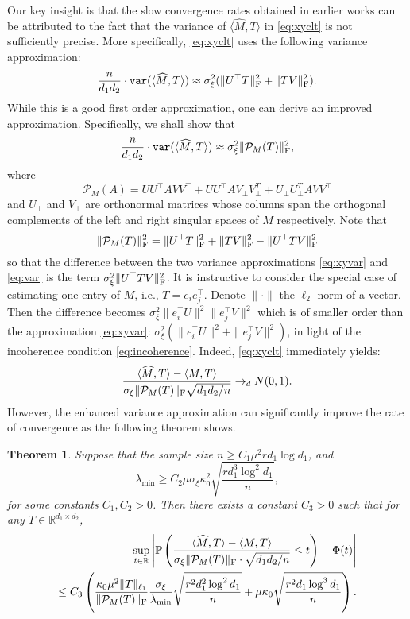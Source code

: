 \documentclass[12pt]{article}
\newcommand{\tF}{{\rm F}}
\newcommand{\R}{\mathbb{R}}
\newcommand{\cP}{\mathcal{P}}
\newtheorem{Theorem}{Theorem}
\theoremstyle{plain}
\begin{document}
\begin{sloppypar}
Our key insight is that the slow convergence rates obtained in earlier works can be attributed to the fact that the variance of $\langle \widehat{M}, T\rangle$ in \eqref{eq:xyclt} is not sufficiently precise. More specifically, \eqref{eq:xyclt} uses the following variance approximation:
\begin{equation}\label{eq:xyvar}
{n\over d_1d_2}\cdot \texttt{var}(\langle \widehat{M}, T\rangle)\approx \sigma_\xi^2(\|U^\top T\|_{\rm F}^2+\|TV\|_{\rm F}^2).
\end{equation}
While this is a good first order approximation, one can derive an improved approximation. Specifically, we shall show that 
\begin{equation}\label{eq:var}
{n\over d_1d_2}\cdot \texttt{var}(\langle \widehat{M}, T\rangle)\approx \sigma_\xi^2\|\cP_M(T)\|_{\rm F}^2,
\end{equation}
where
$$\cP_M(A)=UU^\top AVV^\top+UU^\top AV_\perp V_\perp^T+U_\perp U_\perp^TAVV^\top$$
and $U_\perp$ and $V_\perp$ are orthonormal matrices whose columns span the orthogonal complements of the left and right singular spaces of $M$ respectively. Note that
$$
\|\cP_M(T)\|_{\rm F}^2=\|U^\top T\|_{\rm F}^2+\|TV\|_{\rm F}^2-\|U^\top TV\|_{\rm F}^2
$$
so that the difference between the two variance approximations \eqref{eq:xyvar} and \eqref{eq:var} is the term $\sigma_\xi^2\|U^\top TV\|_{\rm F}^2$. It is instructive to consider the special case of estimating one entry of $M$, i.e., $T=e_ie_j^\top$. Denote $\|\cdot\|$ the $\ell_2$-norm of a vector. 
Then the difference becomes $\sigma_\xi^2\|e_i^\top U\|^2\|e_j^\top V\|^2$ which is of smaller order than the approximation \eqref{eq:xyvar}: $\sigma_\xi^2(\|e_i^\top U\|^2+\|e_j^\top V\|^2)$, in light of the incoherence condition \eqref{eq:incoherence}. Indeed, \eqref{eq:xyclt} immediately yields:
$$
{\langle \widehat{M}, T\rangle-\langle M, T\rangle\over \sigma_\xi\|\cP_M(T)\|_{\rm F}\sqrt{d_1d_2/n}}\to_dN(0,1).
$$
However, the enhanced variance approximation can significantly improve the rate of convergence as the following theorem shows.

\begin{Theorem}\label{thm:asymp-normal}
Suppose that the sample size $n \geq C_1 \mu^2 r d_1 \log d_1$, and
$$
\lambda_{\min}\geq C_2 \mu \sigma_{\xi}\kappa_0^2  \sqrt{\frac{ r  d_1^3 \log ^2 d_1}{n}},
$$
for some constants $C_1,C_2>0$. Then there exists a constant $C_3>0$ such that for any $T
\in \R^{d_1\times d_2}$,
\begin{eqnarray*}
\sup _{t \in \mathbb{R}}\left|\mathbb{P}\left(\frac{\langle \widehat{M}, T\rangle-\langle M, T\rangle}{\sigma_{\xi}\|\cP_M(T) \|_\tF \cdot \sqrt{d_1 d_2 / n}} \leq t\right)-\Phi(t)\right| \\
\le C_3\left(  \frac{ \kappa_0 \mu^2 \|T\|_{\ell_1} }{ \|\cP_M(T)\|_{\mathrm{F}} } \frac{\sigma_{\xi}  }{\lambda_{\min} } \sqrt{\frac{ r^2 d_1^2 \log ^2 d_1}{n}} + \mu \kappa_0 \sqrt{\frac{r^2 d_1 \log ^3 d_1}{n}}\right). %
\end{eqnarray*}
\end{Theorem}


\end{sloppypar}
\end{document}

